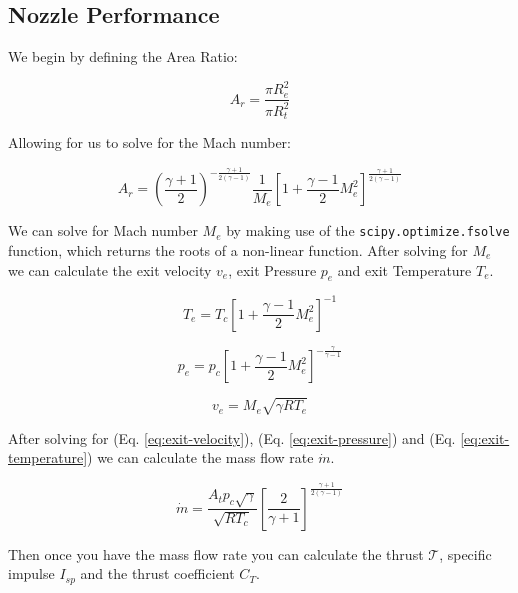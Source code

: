 \documentclass[12pt, Times New Roman]{article}
\begin{document}
    \subsection{Nozzle Performance}
    We begin by defining the Area Ratio:

    \begin{equation}
        A_{r} = \frac{\pi R_{e}^{2}}{\pi R_{t}^{2}}
    \end{equation}

    Allowing for us to solve for the Mach number:

    \begin{equation}
        A_{r} = \left(\frac{\gamma + 1}{2}\right)^{-\frac{\gamma + 1}{2(\gamma - 1)}} \frac{1}{M_{e}} \left[1 + \frac{\gamma - 1}{2} M_{e}^{2}\right]^{\frac{\gamma + 1}{2(\gamma - 1)}}
    \end{equation}

    We can solve for Mach number $M_{e}$ by making use of the \verb|scipy.optimize.fsolve| function, which returns the roots 
    of a non-linear function. After solving for $M_{e}$ we can calculate the exit velocity $v_{e}$, exit Pressure $p_{e}$ and exit Temperature $T_{e}$.

    \begin{equation}
        \label{eq:exit-temperature}
        T_{e} = T_{c} \left[1 + \frac{\gamma - 1}{2} M_{e}^{2}\right]^{-1} 
    \end{equation}

    \begin{equation}
        \label{eq:exit-pressure}
        p_{e} = p_{c} \left[1 + \frac{\gamma - 1}{2} M_{e}^{2}\right]^{-\frac{\gamma}{\gamma - 1}}
    \end{equation}

    \begin{equation}
        \label{eq:exit-velocity}
        v_{e} = M_{e} \sqrt{\gamma R T_{e}}
    \end{equation}

    After solving for (Eq. \ref{eq:exit-velocity}), (Eq. \ref{eq:exit-pressure}) and (Eq. \ref{eq:exit-temperature}) we can calculate the mass flow rate $\dot{m}$.

    \begin{equation}
        \label{eq:mass-flow-rate}
        \dot{m} = \frac{A_{t} p_{c} \sqrt{\gamma}}{\sqrt{R T_{c}}} \left[ \frac{2}{\gamma + 1} \right]^{\frac{\gamma + 1}{2(\gamma - 1)}}
    \end{equation}

    Then once you have the mass flow rate you can calculate the thrust $\mathcal{T}$, specific impulse $I_{sp}$ and the thrust coefficient $C_{T}$.
\end{document}
